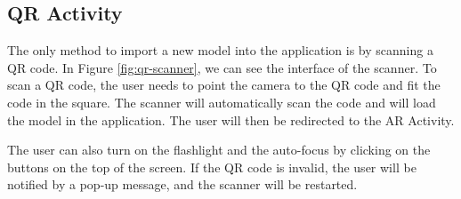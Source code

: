 \subsection{QR Activity}
The only method to import a new model into the application is by scanning a \ac{QR} code. In  Figure \ref{fig:qr-scanner}, we can see the interface of the scanner. To scan a \ac{QR} code, the user needs to point the camera to the \ac{QR} code and fit the code in the square. The scanner will automatically scan the code and will load the model in the application. The user will then be redirected to the AR Activity.

The user can also turn on the flashlight and the auto-focus by clicking on the buttons on the top of the screen. If the QR code is invalid, the user will be notified by a pop-up message, and the scanner will be restarted.

